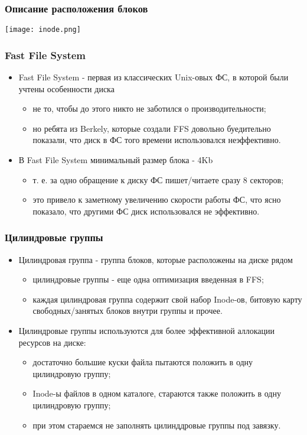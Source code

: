 \begin{frame}
\frametitle{Описание расположения блоков}
\begin{center}
  \texttt{[image: inode.png]}
\end{center}
\end{frame}

\begin{frame}
\frametitle{Fast File System}
\begin{itemize}
  \item Fast File System - первая из классических Unix-овых ФС, в которой были
  учтены особенности диска
  \begin{itemize}
    \item не то, чтобы до этого никто не заботился о производительности;
    \item но ребята из Berkely, которые создали FFS довольно буедительно
    показали, что диск в ФС того времени использовался неэффективно.
  \end{itemize}
  \item В Fast File System минимальный размер блока - 4Kb
  \begin{itemize}
    \item т. е. за одно обращение к диску ФС пишет/читаете сразу 8 секторов;
    \item это привело к заметному увеличению скорости работы ФС, что ясно
    показало, что другими ФС диск использовался не эффективно.
  \end{itemize}
\end{itemize}
\end{frame}

\begin{frame}
\frametitle{Цилиндровые группы}
\begin{itemize}
  \item Цилиндровая группа - группа блоков, которые расположены на диске рядом
  \begin{itemize}
    \item цилиндровые группы - еще одна оптимизация введенная в FFS;
    \item каждая цилиндровая группа содержит свой набор Inode-ов, битовую карту
    свободных/занятых блоков внутри группы и прочее.
  \end{itemize}
  \item Цилиндровые группы используются для более эффективной аллокации ресурсов
  на диске:
  \begin{itemize}
    \item достаточно большие куски файла пытаются положить в одну цилиндровую
    группу;
    \item Inode-ы файлов в одном каталоге, стараются также положить в одну
    цилиндровую группу;
    \item при этом стараемся не заполнять цилинддровые группы под завязку.
  \end{itemize}
\end{itemize}
\end{frame}

